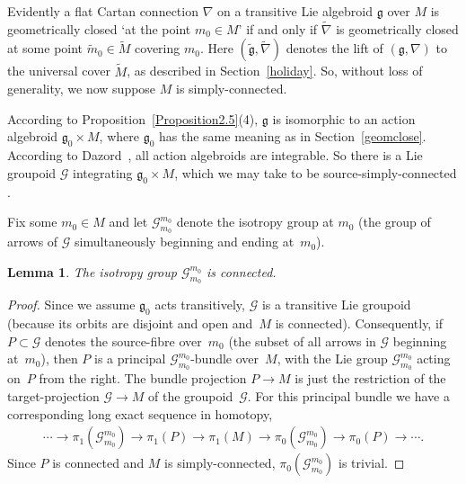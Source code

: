 \documentclass[11pt]{article}
\numberwithin{equation}{section}
\newtheorem{LemmaBlaom}[TheoremBlaom]{Lemma}
\begin{document}
Evidently a f\/lat Cartan connection $\nabla$ on a transitive Lie
algebroid $\mathfrak g$ over $M$ is geometrically closed `at the point
$m_0 \in M$' if and only if $\tilde \nabla$ is geometrically closed at
some point $\tilde m_0 \in \tilde M$ covering $m_0$. Here $(\tilde
{\mathfrak g},\tilde \nabla )$ denotes the lift of $({\mathfrak
  g},\nabla )$ to the universal cover $\tilde M$, as described in
Section~\ref{holiday}. So, without loss of generality, we now suppose $M$ is
simply-connected.

According to Proposition~\ref{Proposition2.5}(4),
  $\mathfrak g$ is
isomorphic to an action algebroid ${\mathfrak g}_0 \times M$, where
${\mathfrak g}_0$ has the same meaning as in
Section~\ref{geomclose}. According to Dazord~\cite{Dazord_97}, all action
algebroids are integrable. So there is a Lie groupoid ${\mathcal G} $
integrating $ {\mathfrak g}_0 \times M$, which we may take to be
source-simply-connected \cite[Lie~I]{Crainic_Fernandes_11}.

Fix some $m_0 \in M$ and let ${\mathcal G}_{m_0}^{m_0}$ denote the
isotropy group at $m_0$ (the group of arrows of ${\mathcal G}$
simultaneously beginning and ending at~$m_0$).

\begin{LemmaBlaom}\label{Lemma4.1}
The isotropy group ${\mathcal G}_{m_0}^{m_0}$ is connected.
\end{LemmaBlaom}

\begin{proof}
  Since we assume ${\mathfrak g}_0$ acts transitively, ${\mathcal G} $
  is a transitive Lie groupoid (because its orbits are disjoint and
  open and~$M$ is connected). Consequently, if $P \subset {\mathcal
    G}$ denotes the source-f\/ibre over~$m_0$ (the subset of all arrows
  in ${\mathcal G} $ beginning at~$m_0$), then $P$ is a principal
  ${\mathcal G}_{m_0}^{m_0}$-bundle over~$M$, with the Lie group
  ${\mathcal G}_{m_0}^{m_0}$ acting on~$P$ from the right. The bundle
  projection $P \rightarrow M$ is just the restriction of the
  target-projection ${\mathcal G} \rightarrow M$ of the groupoid~$\mathcal G$. For this principal bundle we have a corresponding long
  exact sequence in homotopy,
  \begin{gather*}
    \cdots \rightarrow  \pi_1({\mathcal G}_{m_0}^{m_0})\rightarrow \pi_1(P)
    \rightarrow \pi_1(M) \rightarrow \pi_0 ({\mathcal
      G}_{m_0}^{m_0})\rightarrow \pi_0(P) \rightarrow \cdots  .
  \end{gather*}
  Since $P$ is connected and $M$ is simply-connected, $\pi_0({\mathcal
    G}_{m_0}^{m_0})$ is trivial.
\end{proof}
\end{document}
